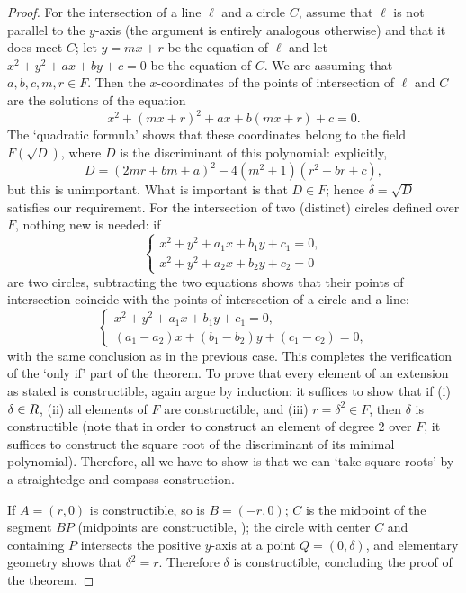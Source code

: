 \begin{proof}
  For the intersection of a line $\ell$ and a circle $C$, assume that
  $\ell$ is not parallel to the $y$-axis (the argument is entirely
  analogous otherwise) and that it does meet $C$; let $y = mx + r$ be
  the equation of $\ell$ and let $x^2 + y^2 + ax + by + c = 0$ be the
  equation of $C$. We are assuming that $a, b, c, m, r \in F$. Then
  the $x$-coordinates of the points of intersection of $\ell$ and $C$
  are the solutions of the equation
  \[
    x^2 + {(mx + r)}^2 + ax + b(mx + r) + c = 0.
  \]
  The `quadratic formula' shows that these coordinates belong to the
  field $F(\sqrt{D})$, where $D$ is the discriminant of this
  polynomial: explicitly,
  \[
    D = {(2mr + bm + a)}^2 - 4(m^2 + 1)(r^2 + br + c),
  \]
  but this is unimportant. What is important is that $D \in F$; hence
  $\delta = \sqrt{D}$ satisfies our requirement.  For the intersection
  of two (distinct) circles defined over $F$, nothing new is needed:
  if
  \[
    \begin{cases}
      x^2 + y^2 + a_1 x + b_1 y + c_1 = 0, \\
      x^2 + y^2 + a_2 x + b_2 y + c_2 = 0
    \end{cases}
  \]
  are two circles, subtracting the two equations shows that their
  points of intersection coincide with the points of intersection of a
  circle and a line:
  \[
    \begin{cases}
      x^2 + y^2 + a_1 x + b_1 y + c_1 = 0, \\
      (a_1 - a_2)x + (b_1 - b_2)y + (c_1 - c_2) = 0,
    \end{cases}
  \]
  with the same conclusion as in the previous case. This completes the
  verification of the `only if' part of the theorem.  To prove that
  every element of an extension as stated is constructible, again
  argue by induction: it suffices to show that if (i) $\delta \in R$,
  (ii) all elements of $F$ are constructible, and (iii)
  $r = \delta^2 \in F$, then $\delta$ is constructible (note that in
  order to construct an element of degree $2$ over $F$, it suffices to
  construct the square root of the discriminant of its minimal
  polynomial). Therefore, all we have to show is that we can `take
  square roots' by a straightedge-and-compass construction.

  If $A = (r, 0)$ is constructible, so is $B = (-r, 0)$; $C$ is the
  midpoint of the segment $BP$ (midpoints are constructible,
  ); the
  circle with center $C$ and containing $P$ intersects the positive
  $y$-axis at a point $Q = (0, \delta)$, and elementary geometry shows
  that $\delta^2 = r$. Therefore $\delta$ is constructible, concluding
  the proof of the theorem.
\end{proof}
